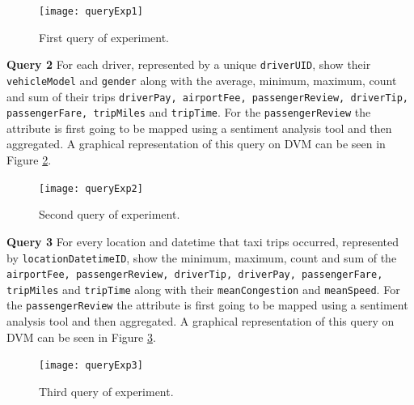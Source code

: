\begin{center}
    \begin{figure}[h]
        \texttt{[image: queryExp1]}
        \caption{First query of experiment.}
        \label{queryExp1}
    \end{figure}
\end{center}

\textbf{Query 2} For each driver, represented by a unique \texttt{driverUID}, show their \texttt{vehicleModel} and \texttt{gender} along with the average, minimum, maximum, count and sum of their trips \texttt{driverPay, airportFee, passengerReview, driverTip, passengerFare, tripMiles} 
 and \texttt{tripTime}. For the \texttt{passengerReview} the attribute is first going to be mapped using a sentiment analysis tool and then aggregated. A graphical representation of this query on DVM can be seen in Figure \ref{queryExp2}.

\begin{center}
    \begin{figure}[h]
        \texttt{[image: queryExp2]}
        \caption{Second query of experiment.}
        \label{queryExp2}
    \end{figure}
\end{center}

\textbf{Query 3} For every location and datetime that taxi trips occurred, represented by \texttt{locationDatetimeID}, show the minimum, maximum, count and sum of the \texttt{airportFee, passengerReview, driverTip, driverPay, passengerFare, tripMiles} and \texttt{tripTime} along with their \texttt{meanCongestion} and \texttt{meanSpeed}. For the \texttt{passengerReview} the attribute is first going to be mapped using a sentiment analysis tool and then aggregated. A graphical representation of this query on DVM can be seen in Figure \ref{queryExp3}.

\begin{center}
    \begin{figure}[h]
        \texttt{[image: queryExp3]}
        \caption{Third query of experiment.}
        \label{queryExp3}
    \end{figure}
\end{center}